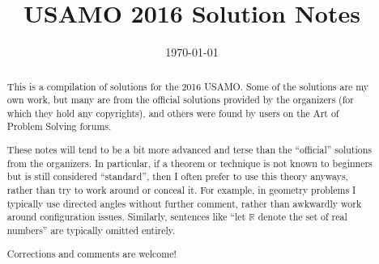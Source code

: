 \documentclass[11pt]{scrartcl}
\title{USAMO 2016 Solution Notes}
\date{\today}
\begin{document}
\maketitle

\begin{abstract}
This is a compilation of solutions
for the 2016 USAMO.
Some of the solutions are my own work,
but many are from the official solutions provided by the organizers
(for which they hold any copyrights),
and others were found by users on the Art of Problem Solving forums.

These notes will tend to be a bit more advanced and terse than the ``official''
solutions from the organizers.
In particular, if a theorem or technique is not known to beginners
but is still considered ``standard'', then I often prefer to
use this theory anyways, rather than try to work around or conceal it.
For example, in geometry problems I typically use directed angles
without further comment, rather than awkwardly work around configuration issues.
Similarly, sentences like ``let $\mathbb{R}$ denote the set of real numbers''
are typically omitted entirely.

Corrections and comments are welcome!
\end{abstract}

\tableofcontents
\newpage

\addtocounter{section}{-1}
\end{document}
